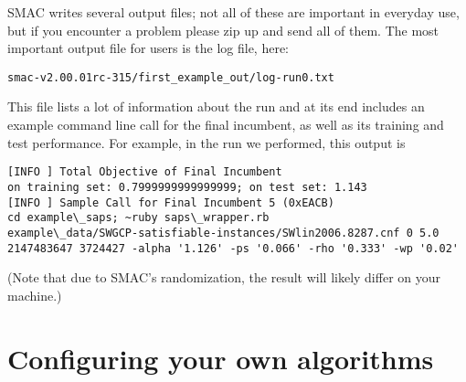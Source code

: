 \documentclass[11pt,letterpaper,twoside]{article}
\begin{document}
SMAC writes several output files; not all of these are important in everyday use, but if you encounter a problem please zip up and send all of them. The most important output file for users is the log file, here:
{\small
\begin{verbatim}
smac-v2.00.01rc-315/first_example_out/log-run0.txt
\end{verbatim}
}
This file lists a lot of information about the run and at its end includes an example command line call for the final incumbent, as well as its training and test performance. For example, in the run we performed, this output is\\
{\small
\begin{verbatim}
[INFO ] Total Objective of Final Incumbent
on training set: 0.7999999999999999; on test set: 1.143
[INFO ] Sample Call for Final Incumbent 5 (0xEACB)
cd example\_saps; ~ruby saps\_wrapper.rb
example\_data/SWGCP-satisfiable-instances/SWlin2006.8287.cnf 0 5.0
2147483647 3724427 -alpha '1.126' -ps '0.066' -rho '0.333' -wp '0.02'   
\end{verbatim}
}
(Note that due to SMAC's randomization, the result will likely differ on your machine.)



\section{Configuring your own algorithms}
\end{document}
